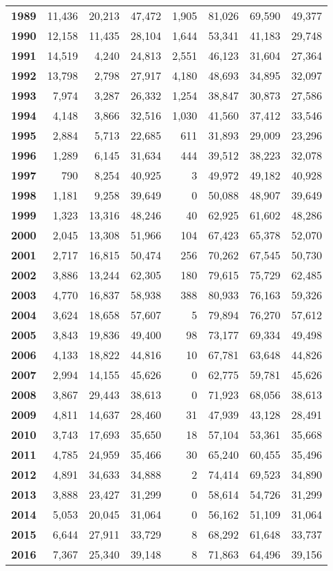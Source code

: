 \begin{table}[h]
{\begin{tabular}{@{}>{\bfseries}r r r c r r c c@{}}
1989 & 11,436 & 20,213 & 47,472 & 1,905 & 81,026 & 69,590 & 49,377 \\
1990 & 12,158 & 11,435 & 28,104 & 1,644 & 53,341 & 41,183 & 29,748 \\
1991 & 14,519 & 4,240 & 24,813 & 2,551 & 46,123 & 31,604 & 27,364 \\
1992 & 13,798 & 2,798 & 27,917 & 4,180 & 48,693 & 34,895 & 32,097 \\
1993 & 7,974 & 3,287 & 26,332 & 1,254 & 38,847 & 30,873 & 27,586 \\
1994 & 4,148 & 3,866 & 32,516 & 1,030 & 41,560 & 37,412 & 33,546 \\
1995 & 2,884 & 5,713 & 22,685 & 611 & 31,893 & 29,009 & 23,296 \\
1996 & 1,289 & 6,145 & 31,634 & 444 & 39,512 & 38,223 & 32,078 \\
1997 & 790 & 8,254 & 40,925 & 3 & 49,972 & 49,182 & 40,928 \\
1998 & 1,181 & 9,258 & 39,649 & 0 & 50,088 & 48,907 & 39,649 \\
1999 & 1,323 & 13,316 & 48,246 & 40 & 62,925 & 61,602 & 48,286 \\
2000 & 2,045 & 13,308 & 51,966 & 104 & 67,423 & 65,378 & 52,070 \\
2001 & 2,717 & 16,815 & 50,474 & 256 & 70,262 & 67,545 & 50,730 \\
2002 & 3,886 & 13,244 & 62,305 & 180 & 79,615 & 75,729 & 62,485 \\
2003 & 4,770 & 16,837 & 58,938 & 388 & 80,933 & 76,163 & 59,326 \\
2004 & 3,624 & 18,658 & 57,607 & 5 & 79,894 & 76,270 & 57,612 \\
2005 & 3,843 & 19,836 & 49,400 & 98 & 73,177 & 69,334 & 49,498 \\
2006 & 4,133 & 18,822 & 44,816 & 10 & 67,781 & 63,648 & 44,826 \\
2007 & 2,994 & 14,155 & 45,626 & 0 & 62,775 & 59,781 & 45,626 \\
2008 & 3,867 & 29,443 & 38,613 & 0 & 71,923 & 68,056 & 38,613 \\
2009 & 4,811 & 14,637 & 28,460 & 31 & 47,939 & 43,128 & 28,491 \\
2010 & 3,743 & 17,693 & 35,650 & 18 & 57,104 & 53,361 & 35,668 \\
2011 & 4,785 & 24,959 & 35,466 & 30 & 65,240 & 60,455 & 35,496 \\
2012 & 4,891 & 34,633 & 34,888 & 2 & 74,414 & 69,523 & 34,890 \\
2013 & 3,888 & 23,427 & 31,299 & 0 & 58,614 & 54,726 & 31,299 \\
2014 & 5,053 & 20,045 & 31,064 & 0 & 56,162 & 51,109 & 31,064 \\
2015 & 6,644 & 27,911 & 33,729 & 8 & 68,292 & 61,648 & 33,737 \\
2016 & 7,367 & 25,340 & 39,148 & 8 & 71,863 & 64,496 & 39,156 \\
\bottomrule
\end{tabular}
}
\end{table}
